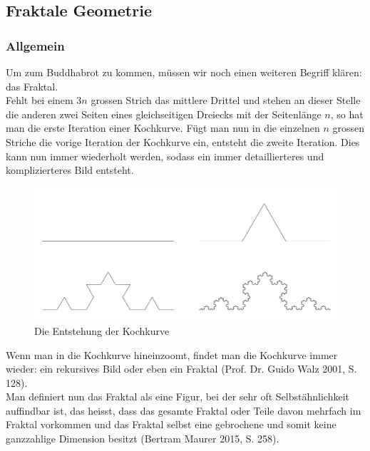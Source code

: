 \subsection{Fraktale Geometrie}
\subsubsection{Allgemein}
Um zum Buddhabrot zu kommen, müssen wir noch einen weiteren Begriff klären: das Fraktal.\\ Fehlt bei einem 3$n$ grossen Strich das mittlere Drittel und stehen an dieser Stelle die anderen zwei Seiten eines gleichseitigen Dreiecks mit der Seitenlänge $n$, so hat man die erste Iteration einer Kochkurve. Fügt man nun in die einzelnen $n$ grossen Striche die vorige Iteration der Kochkurve ein, entsteht die zweite Iteration. Dies kann nun immer wiederholt werden, sodass ein immer detaillierteres und komplizierteres Bild entsteht.\\
\begin{figure}[h]
    \centering
    \includegraphics[width=.5\textwidth]{Pictures/Kochkurve.png}
    \caption{Die Entstehung der Kochkurve}
    \label{fig:Kochkurve}
\end{figure}
Wenn man in die Kochkurve hineinzoomt, findet man die Kochkurve immer wieder: ein rekursives Bild oder eben ein Fraktal (Prof. Dr. Guido Walz 2001, S. 128).\\Man definiert nun das Fraktal als eine Figur, bei der sehr oft Selbstähnlichkeit auffindbar ist, das heisst, dass das gesamte Fraktal oder Teile davon mehrfach im Fraktal vorkommen und das Fraktal selbst eine gebrochene und somit keine ganzzahlige Dimension besitzt (Bertram Maurer 2015, S. 258).\\

